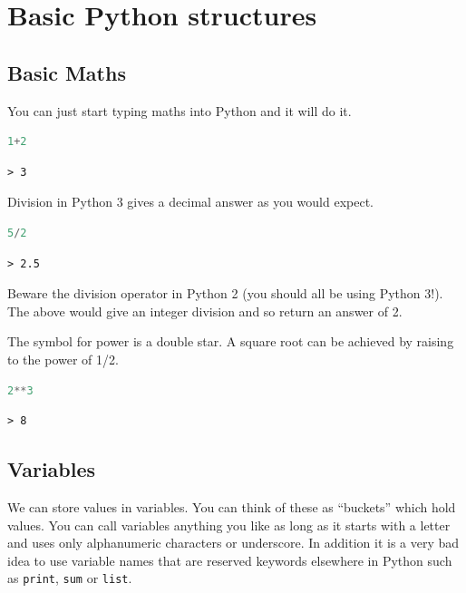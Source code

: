 \section{Basic Python structures}
	\subsection{Basic Maths}
You can just start typing maths into Python and it will do it.
		\begin{lstlisting}[language=Python]
1+2\end{lstlisting}
		\begin{verbatim}> 3\end{verbatim}
		
Division in Python 3 gives a decimal answer as you would expect.
		\begin{lstlisting}[language=Python]
5/2\end{lstlisting}
		\begin{verbatim}> 2.5\end{verbatim}

		Beware the division operator in Python 2 (you should all be using Python 3!). The above would give an integer division and so return an answer of 2.
		
		The symbol for power is a double star. A square root can be achieved by raising to the power of 1/2.
		\begin{lstlisting}[language=Python]
2**3\end{lstlisting}
		\begin{verbatim}> 8\end{verbatim}

	\subsection{Variables}\label{types}
		We can store values in variables. You can think of these as ``buckets'' which hold values. You can call variables anything you like as long as it starts with a letter and uses only alphanumeric characters or underscore. In addition it is a very bad idea to use variable names that are reserved keywords elsewhere in Python such as \texttt{print}, \texttt{sum} or \texttt{list}.

